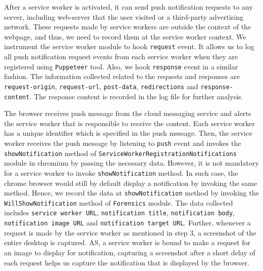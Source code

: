 \textbf{}
After a service worker is activated, it can send push notification requests to any server, including web-server that the user visited or a third-party advertising network.
These requests made by service workers are outside the context of the webpage, and thus, we need to record them at the service worker context. We instrument the service worker module to hook \texttt{request} event. It allows us to log all push notification request events from each service worker when they are registered using \texttt{Puppeteer} tool.  Also, we hook \texttt{response} event in a similar fashion. The information collected related to the requests and responses are \texttt{request-origin},  \texttt{request-url}, \texttt{post-data}, \texttt{redirections} and \texttt{response-content}. The response content is recorded in the log file for further analysis.


\textbf{}
The browser receives push message from the cloud messaging service and alerts the service worker that is responsible to receive the content. Each service worker has a unique identifier which is specified in the push message. Then, the service worker receives the push message by listening to \texttt{push} event and invokes the \texttt{showNotification} method of \texttt{ServiceWorkerRegistrationNotifications} module in chromium by passing the necessary data. However, it is not mandatory for a service worker to invoke \texttt{showNotification} method. In such case, the chrome browser would still by default display a notification by invoking the same method. Hence, we record the data at \texttt{showNotification} method by invoking the \texttt{WillShowNotification} method of \texttt{Forensics} module. The data collected includes \texttt{service worker URL}, \texttt{notification title}, \texttt{notification body}, \texttt{notification image URL} and \texttt{notification target URL}. Further, whenever a request is made by the service worker as mentioned in step 3, a screenshot of the entire desktop is captured. AS, a service worker is bound to make a request for an image to display for notification, capturing a screenshot after a short delay of each request helps us capture the notification that is displayed by the browser.


